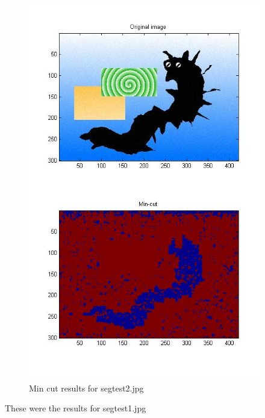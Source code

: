 \documentclass[11pt,psfig]{article}
\begin{document}
\begin{figure}[H]
\centering
\includegraphics[width=4in]{prob5plotB_1.jpg}
\caption{Min cut results for segtest2.jpg}
\end{figure}

These were the results for segtest1.jpg
\end{document}
